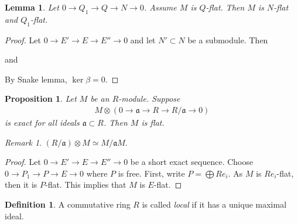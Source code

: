 \documentclass[12pt]{report}
\theoremstyle{plain}
\newtheorem{lemma}[theorem]{Lemma}
\newtheorem{proposition}[theorem]{Proposition}
\theoremstyle{remark}
\newtheorem*{remark}{Remark}
\theoremstyle{definition}
\newtheorem{definition}[theorem]{Definition}
\begin{document}
\begin{lemma}
    Let $0\to Q_1\to Q\to N\to 0$. Assume $M$ is $Q$-flat. Then $M$ is $N$-flat and $Q_1$-flat.
\end{lemma}
\begin{proof}
    Let $0\to E'\to E\to E''\to 0$ and let $N'\subset N$ be a submodule. Then
    \begin{figure}[H]
        \centering
    \end{figure}
    \noindent and
    \begin{figure}[H]
        \centering
    \end{figure}
    \noindent By Snake lemma, $\ker\beta = 0$.
\end{proof}

\begin{proposition}\label{prop:test_for_flatness}
    Let $M$ be an $R$-module. Suppose
    \begin{align*}
        M\otimes (0\to \mathfrak{a}\to R\to R/\mathfrak{a}\to 0)
    \end{align*}
    is exact for all ideals $\mathfrak{a}\subset R$. Then $M$ is flat.
\end{proposition}
\begin{remark}
    $(R/\mathfrak{a})\otimes M\simeq M/\mathfrak{a}M$.
\end{remark}
\begin{proof}
    Let $0\to E'\to E\to E''\to 0$ be a short exact sequence. Choose $0\to P_1\to P\to E\to 0$ where $P$ is free. First, write $P=\bigoplus Re_i$. As $M$ is $Re_i$-flat, then it is $P$-flat. This implies that $M$ is $E$-flat.
\end{proof}

\begin{definition}
    A commutative ring $R$ is called \emph{local} if it has a unique maximal ideal.
\end{definition}
\end{document}
